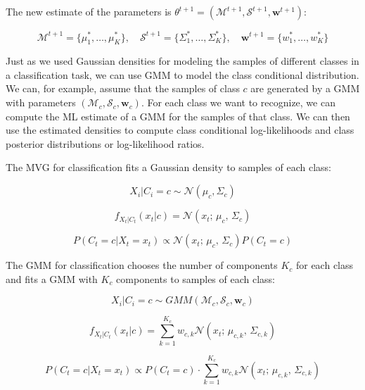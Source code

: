 The new estimate of the parameters is $\theta^{t+1} = (\mathcal{M}^{t+1}, \mathcal{S}^{t+1}, \mathbf{w}^{t+1})$:

\[
\mathcal{M}^{t+1} = \{\mu_1^*, \ldots, \mu_K^*\},\quad \mathcal{S}^{t+1} = \{\Sigma_1^*, \ldots, \Sigma_K^*\},\quad \mathbf{w}^{t+1} = \{w_1^*, \ldots, w_K^*\}
\]

Just as we used Gaussian densities for modeling the samples of different classes in a classification task, we can use GMM to model the class conditional distribution. We can, for example, assume that the samples of class $c$ are generated by a GMM with parameters $(\mathcal{M}_c, \mathcal{S}_c, \mathbf{w}_c)$. For each class we want to recognize, we can compute the ML estimate of a GMM for the samples of that class. We can then use the estimated densities to compute class conditional log-likelihoods and class posterior distributions or log-likelihood ratios.

The MVG for classification fits a Gaussian density to samples of each class:


\begin{equation*}
X_i | C_i = c \sim \mathcal{N}(\mu_c, \Sigma_c)
\end{equation*}

\begin{equation*}
f_{X_t|C_t}(x_t|c) = \mathcal{N}(x_t;\, \mu_c,\, \Sigma_c)
\end{equation*}

\begin{equation*}
P(C_t = c | X_t = x_t) \propto \mathcal{N}(x_t;\, \mu_c,\, \Sigma_c) P(C_t = c)
\end{equation*}

The GMM for classification chooses the number of components $K_c$ for each class and fits a GMM with $K_c$ components to samples of each class:


\begin{equation*}
X_i | C_i = c \sim GMM(\mathcal{M}_c, \mathcal{S}_c, \mathbf{w}_c)
\end{equation*}

\begin{equation*}
f_{X_t|C_t}(x_t|c) = \sum_{k=1}^{K_c} w_{c,k} \mathcal{N}(x_t;\, \mu_{c,k},\, \Sigma_{c,k})
\end{equation*}

\begin{equation*}
P(C_t = c | X_t = x_t) \propto P(C_t = c) \cdot \sum_{k=1}^{K_c} w_{c,k} \mathcal{N}(x_t;\, \mu_{c,k},\, \Sigma_{c,k})
\end{equation*}

